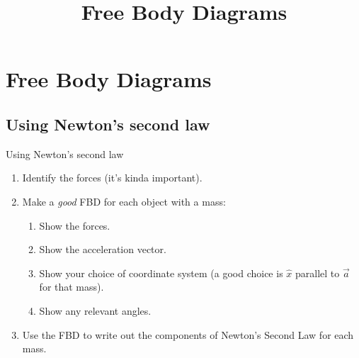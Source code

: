 \documentclass[aspectratio=169,
hyperref={colorlinks,urlcolor=blue}
]{beamer}
\begin{document}

\section{Free Body Diagrams}
\label{sec:fbds}
\title{Free Body Diagrams}
\author{\insertsubsection}



\begin{frame}
\titlepage
\thispagestyle{empty}
\end{frame}


\subsection{Using Newton's second law}
\label{subsec:usingewtonssecondlaw}
\begin{frame}{Using Newton's second law}
\begin{enumerate}
\item Identify the forces (it's kinda important).
\item Make a \emph{good} FBD for each object with a mass:
\begin{enumerate}
\item Show the forces.
\item Show the acceleration vector.
\item Show your choice of coordinate system (a good choice is $\hat x$ parallel to $\vec a$ for that mass).
\item Show any relevant angles.
\end{enumerate}
\item Use the FBD to write out the components of Newton's Second Law for each mass.
\end{enumerate}

\end{frame}



\end{document}
